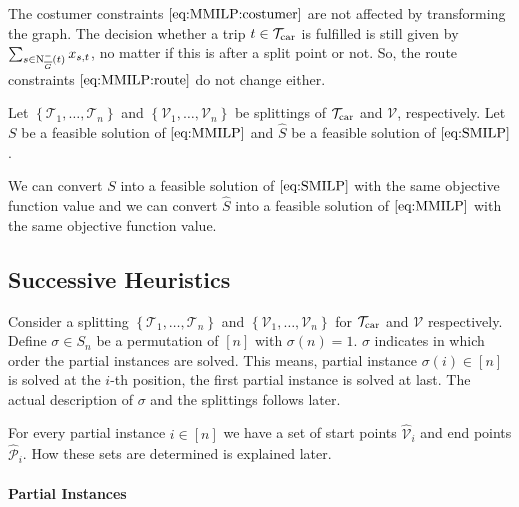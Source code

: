 The costumer constraints $\eqref{eq:MMILP:costumer}$ are not affected by transforming the graph. The decision whether a trip $t\in\mathcal{T}_{\operatorname{car}}$ is fulfilled is still given by $\sum_{s\in\operatorname{N}_{\overline{G}}^-(t)} x_{s,t}$, no matter if this is after a split point or not. So, the route constraints $\eqref{eq:MMILP:route}$ do not change either.

\begin{theorem}

Let $\left\{\mathcal{T}_1,\dots,\mathcal{T}_n\right\}$ and $\left\{\mathcal{V}_1,\dots,\mathcal{V}_n\right\}$ be splittings of $\mathcal{T}_{\operatorname{car}}$ and $\mathcal{V}$, respectively. Let $S$ be a feasible solution of $\eqref{eq:MMILP}$ and $\hat{S}$ be a feasible solution of $\eqref{eq:SMILP}$.

We can convert $S$ into a feasible solution of $\eqref{eq:SMILP}$ with the same objective function value and we can convert $\hat{S}$ into a feasible solution of $\eqref{eq:MMILP}$ with the same objective function value.

\end{theorem}


\subsection{Successive Heuristics}

Consider a splitting $\left\{\mathcal{T}_1,\dots,\mathcal{T}_n\right\}$ and $\left\{\mathcal{V}_1,\dots,\mathcal{V}_n\right\}$ for $\mathcal{T}_{\operatorname{car}}$ and $\mathcal{V}$ respectively. Define $\sigma\in S_n$ be a permutation of $[n]$ with $\sigma(n)=1$. $\sigma$ indicates in which order the partial instances are solved. This means, partial instance $\sigma(i)\in[n]$ is solved at the $i$-th position, the first partial instance is solved at last. The actual description of $\sigma$ and the splittings follows later.

For every partial instance $i\in[n]$ we have a set of start points $\hat{\mathcal{V}}_i$ and end points $\hat{\mathcal{P}}_i$. How these sets are determined is explained later.

\paragraph{Partial Instances}\parfill

